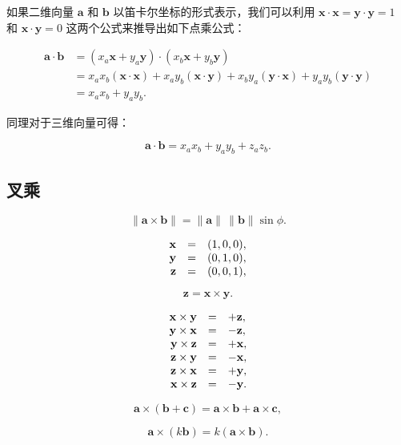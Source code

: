 \documentclass[lang=cn,12pt]{elegantbook}
\begin{document}
如果二维向量 $\mathbf{a}$ 和 $\mathbf{b}$ 以笛卡尔坐标的形式表示，我们可以利用 $\mathbf{x} \cdot \mathbf{x} = \mathbf{y} \cdot \mathbf{y} = 1$ 和 $\mathbf{x} \cdot \mathbf{y} = 0$ 这两个公式来推导出如下点乘公式：

$$
  \begin{aligned}
    \mathbf{a} \cdot \mathbf{b} & = (x_a\mathbf{x}+y_a\mathbf{y}) \cdot (x_b\mathbf{x}+y_b\mathbf{y})\\
    & =x_ax_b(\mathbf{x}\cdot\mathbf{x}) + x_ay_b(\mathbf{x}\cdot\mathbf{y}) + x_by_a(\mathbf{y}\cdot\mathbf{x}) + y_ay_b(\mathbf{y}\cdot\mathbf{y}) \\
    & = x_ax_b + y_ay_b.
  \end{aligned}
$$

同理对于三维向量可得：

$$
  \mathbf{a} \cdot \mathbf{b} = x_ax_b + y_ay_b + z_az_b.
$$

\subsection{叉乘}

$$
  \|\mathbf{a}\times\mathbf{b}\|=\|\mathbf{a}\|\,\|\mathbf{b}\|\sin\phi.
$$

$$
  \begin{array}{r c l}{\mathbf{x}}&{=}&{(1,0,0),}\\ {\mathbf{y}}&{=}&{(0,1,0),}\\ {\mathbf{z}}&{=}&{(0,0,1),}\end{array}
$$

$$
  \mathbf{z}=\mathbf{x}\times\mathbf{y}.
$$

$$
  \begin{array}{r c l}{{\mathbf{x}\times\mathbf{y}}}&{{=}}&{{+\mathbf{z},}}\\ {{\mathbf{y}\times\mathbf{x}}}&{{=}}&{{-\mathbf{z},}}\\ {{\mathbf{y}\times\mathbf{z}}}&{{=}}&{{+\mathbf{x},}}\\ {{\mathbf{z}\times\mathbf{y}}}&{{=}}&{{-\mathbf{x},}}\\ {{\mathbf{z}\times\mathbf{x}}}&{{=}}&{{+\mathbf{y},}}\\ {{\mathbf{x}\times\mathbf{z}}}&{{=}}&{{-\mathbf{y}.}}\end{array}
$$

$$
  \mathbf{a}\times(\mathbf{b}+\mathbf{c})=\mathbf{a}\times\mathbf{b}+\mathbf{a}\times\mathbf{c},
$$

$$
  \mathbf{a}\times(k\mathbf{b})=k(\mathbf{a}\times\mathbf{b}).
$$
\end{document}
